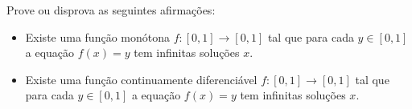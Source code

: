 Prove ou disprova as seguintes afirmações:\begin{itemize}

\item[(a)] Existe uma função monótona \(f \colon  [0, 1] \to [0, 1]\) tal que para cada \(y \in [0, 1]\) a equação \(f(x) = y\) tem infinitas soluções \(x\).
\item[(b)] Existe uma função continuamente diferenciável \(f \colon  [0, 1] \to [0, 1]\) tal que para cada \(y \in [0, 1]\) a equação \(f(x) = y\) tem infinitas soluções \(x\).
\end{itemize}

